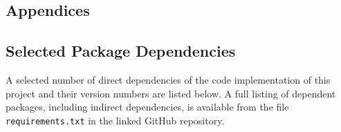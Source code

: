 \documentclass[a4paper,11pt,openany]{book}
\begin{document}
\begin{appendices}
\part{Appendices}
\label{sec:orge8718fe}
\chapter{Selected Package Dependencies}
\label{sec:orgb71f5d1}
\label{org4f65a1b}

A selected number of direct dependencies of the code implementation of this project and their version numbers are listed below.
A full listing of dependent packages, including indirect dependencies, is available from the file \texttt{requirements.txt} in the linked GitHub repository.


\end{appendices}
\end{document}
